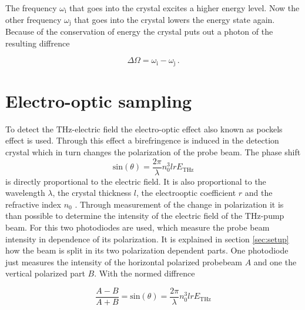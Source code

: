 The frequency $\omega_\text{i}$ that goes into the crystal excites a higher energy level.
Now the other frequency $\omega_\text{j}$ that goes into the crystal lowers the energy state again.
Because of the conservation of energy the crystal puts out a photon of the resulting diffrence

\begin{equation}
    \Delta\Omega = \omega_\text{i} - \omega_\text{j} \, .
\end{equation}





\section{Electro-optic sampling}\label{sec:eos}
To detect the $\si{\tera\hertz}$-electric field the electro-optic effect also known as pockels effect is used.
Through this effect a birefringence is induced in the detection crystal which in turn changes the polarization of the probe beam.
The phase shift 
\begin{equation}
    \text{sin}(\theta) = \frac{2\pi}{\lambda} n_0^3 l r E_\text{THz}
\end{equation}
is directly proportional to the electric field. 
It is also proportional to the wavelength $\lambda$, the crystal thickness $l$, the electrooptic coefficient $r$ and the refractive index $n_0$ \cite{wiki_book}. 
Through measurement of the change in polarization it is than possible to determine the intensity of the electric field of the $\si{\tera\hertz}$-pump beam.
For this two photodiodes are used, which measure the probe beam intensity in dependence of its polarization.
It is explained in section \ref{sec:setup} how the beam is split in its two polarization dependent parts.
One photodiode just measures the intensity of the horizontal polarized probebeam $A$ and one the vertical polarized part $B$.
With the normed diffrence 

\begin{equation}
    \frac{A-B}{A+B} = \text{sin}(\theta) = \frac{2\pi}{\lambda} n_0^3 l r E_\text{THz}
    \label{eq:electricfield_A_B}
\end{equation}

